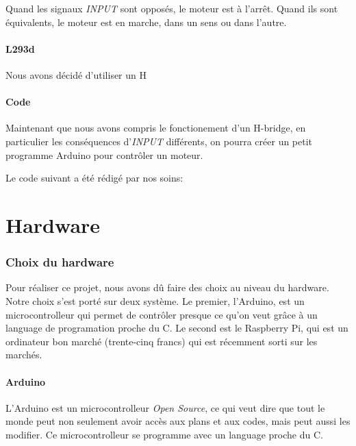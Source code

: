 \documentclass[a4paper,12pt]{article}
\begin{document}
{\begin{table}[h]
\caption{\label{tableDeVerite} Table de v\'erit\'e accompagnant le sch\'ema du
H-bridge (fig.(\ref{H-bridge}))}

Quand les signaux \emph{INPUT} sont oppos\'es, le moteur est \`a
l'arr\^et. Quand ils sont \'equivalents, le moteur est en marche, dans un sens
ou dans l'autre.

\end{table}

\subsection{L293d}
Nous avons décidé d'utiliser un H

\subsection{Code}

Maintenant que nous avons compris le fonctionement d'un H-bridge, en
particulier les cons\'equences d'\emph{INPUT} diff\'erents, on pourra cr\'eer
un petit programme Arduino pour contr\^oler un moteur.

Le code suivant a \'et\'e r\'edig\'e par nos soins:






\part{Hardware}

\section{Choix du hardware}
Pour réaliser ce projet, nous avons dû faire des choix au niveau du hardware. Notre choix s'est porté sur deux système. Le premier, l'Arduino, est un microcontrolleur qui permet de contrôler presque ce qu'on veut grâce à un language de programation proche du C. Le second est le Raspberry Pi, qui est un ordinateur bon marché (trente-cinq francs) qui est récemment sorti sur les marchés. 


\subsection{Arduino}
L'Arduino \cite{Arduino} est un microcontrolleur \textit{Open Source}, ce qui veut dire que tout le monde peut non seulement avoir accès aux plans et aux codes, mais peut aussi les modifier. Ce microcontrolleur se programme avec un language proche du C. 


}
\end{document}
